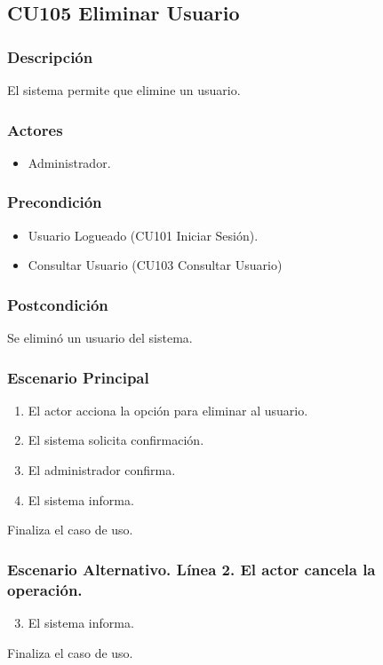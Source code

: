 \subsection{CU105 Eliminar Usuario}
\subsubsection{Descripci\'{o}n}
El sistema permite que elimine un usuario.
\subsubsection{Actores}
\begin{itemize}
\item Administrador.
\end{itemize}
\subsubsection{Precondici\'{o}n}
\begin{itemize}
\item Usuario Logueado (CU101 Iniciar Sesi\'{o}n).
\item Consultar Usuario (CU103 Consultar Usuario)
\end{itemize}
\subsubsection{Postcondici\'{o}n}
Se elimin\'{o} un usuario del sistema.
\subsubsection{Escenario Principal}
\begin{enumerate}
\item El actor acciona la opci\'{o}n para eliminar al usuario.
\item El sistema solicita confirmaci\'{o}n.
\item El administrador confirma.
\item El sistema informa.
\end{enumerate}
Finaliza el caso de uso.
\subsubsection{Escenario Alternativo. L\'{i}nea 2. El actor cancela la operaci\'{o}n.}
\begin{enumerate}
\setcounter{enumi}{2}
\item El sistema informa.
\end{enumerate}
Finaliza el caso de uso.
